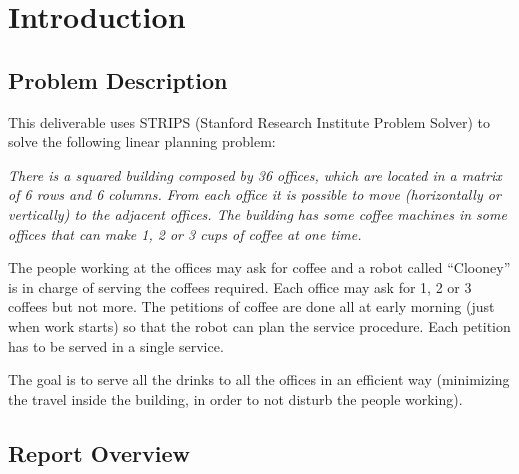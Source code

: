 \section{Introduction}

\subsection{Problem Description}

This deliverable uses STRIPS (Stanford Research Institute Problem Solver) to solve the following linear planning problem:

\begin{displayquote}
\itshape
There is a squared building composed by 36 offices, which are located in a matrix of 6 rows and 6 columns. From each office it is possible to move (horizontally or vertically) to the adjacent offices. The building has some coffee machines in some offices that can make 1, 2 or 3 cups of coffee at one time. 	

The people working at the offices may ask for coffee and a robot called “Clooney” is in charge of serving the coffees required. Each office may ask for 1, 2 or 3 coffees but not more. The petitions of coffee are done all at early morning (just when work starts) so that the robot can plan the service procedure. Each petition has to be served in a single service.

The goal is to serve all the drinks to all the offices in an efficient way (minimizing the travel inside the building, in order to not disturb the people working).
\end{displayquote}

\subsection{Report Overview}

